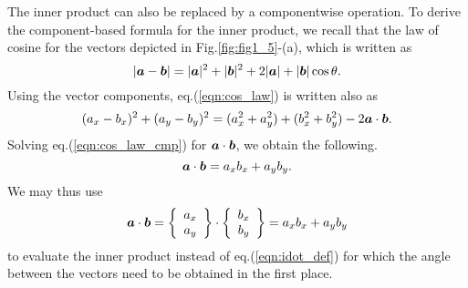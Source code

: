 \documentclass[10pt,a4j]{article}
\begin{document}
The inner product can also be replaced by a componentwise operation. To derive the component-based formula for the inner product, we recall that the law of cosine for the vectors depicted in Fig.\ref{fig:fig1_5}-(a), which is written as 
\begin{equation}
    \left| \mbox{\boldmath $a$}-\mbox{\boldmath $b$}\right|= 
    |\mbox{\boldmath $a$}|^2+|\mbox{\boldmath $b$}|^2
    +
    2|\mbox{\boldmath $a$}|+|\mbox{\boldmath $b$}| \cos\theta
    .
    \label{eqn:cos_law}
\end{equation}
Using the vector components, eq.(\ref{eqn:cos_law}) is written also as 
\begin{equation}
    (a_x-b_x)^2+(a_y-b_y)^2
    =
    (a_x^2+a_y^2)+(b_x^2+b_y^2) -2\mbox{\boldmath $a$}\cdot\mbox{\boldmath $b$}.
    \label{eqn:cos_law_cmp}
\end{equation}
Solving eq.(\ref{eqn:cos_law_cmp}) for $\mbox{\boldmath $a$}\cdot\mbox{\boldmath $b$}$, we obtain the following. 
\begin{equation}
    \mbox{\boldmath $a$}\cdot\mbox{\boldmath $b$}=a_xb_x+a_yb_y.
    \label{eqn:}
\end{equation}
We may thus use 
\begin{equation}
    \mbox{\boldmath $a$} \cdot \mbox{\boldmath $b$}
    =
    \left\{
        \begin{array}{c}
            a_x \\
            a_y 
        \end{array}
    \right\}
    \cdot
    \left\{
        \begin{array}{c}
            b_x \\
            b_y 
        \end{array}
    \right\}
    = a_xb_x+a_yb_y
    \label{eqn:}
\end{equation}
to evaluate the inner product instead of eq.(\ref{eqn:idot_def}) for which the angle between the vectors need to be obtained in the first place. 
\end{document}

